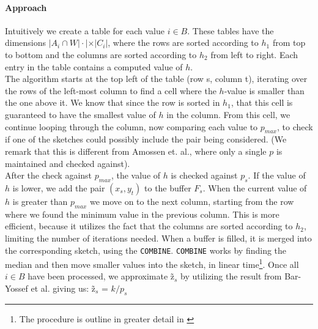 \documentclass[a4paper,11pt]{article}
\begin{document}
\paragraph{Approach}
Intuitively we create a table for each value $i \in B$. These tables have the dimensions $|A_i\cap W|\cdot | \times |C_i|$, where the rows are sorted according to $h_1$ from top to bottom and the columns are sorted according to $h_2$ from left to right. Each entry in the table contains a computed value of $h$.\\

The algorithm starts at the top left of the table (row s, column t), iterating over the rows of the left-most column to find a cell where the $h$-value is smaller than the one above it. We know that since the row is sorted in $h_1$, that this cell is guaranteed to have the smallest value of $h$ in the column. From this cell, we continue looping through the column, now comparing each value to $p_{max}$, to check if one of the sketches could possibly include the pair being considered. (We remark that this is different from Amossen et. al., where only a single $p$ is maintained and checked against). \\

After the check against $p_{max}$, the value of $h$ is checked against $p_s$. If the value of $h$ is lower, we add the pair $(x_s, y_t)$ to the buffer $F_s$. When the current value of $h$ is greater than $p_{max}$ we move on to the next column, starting from the row where we found the minimum value in the previous column. This is more efficient, because it utilizes the fact that the columns are sorted according to $h_2$, limiting the number of iterations needed. When a buffer is filled, it is merged into the corresponding sketch, using the \texttt{COMBINE}. \texttt{COMBINE} works by finding the median and then move smaller values into the sketch, in linear time\footnote{The procedure is outline in greater detail in \cite{paper:amossen}}. Once all $i \in B$ have been processed, we approximate \~{z}$_s$ by utilizing the result from Bar-Yossef et al. giving us: \~{z}$_s$ = $k/p_s$


\end{document}
